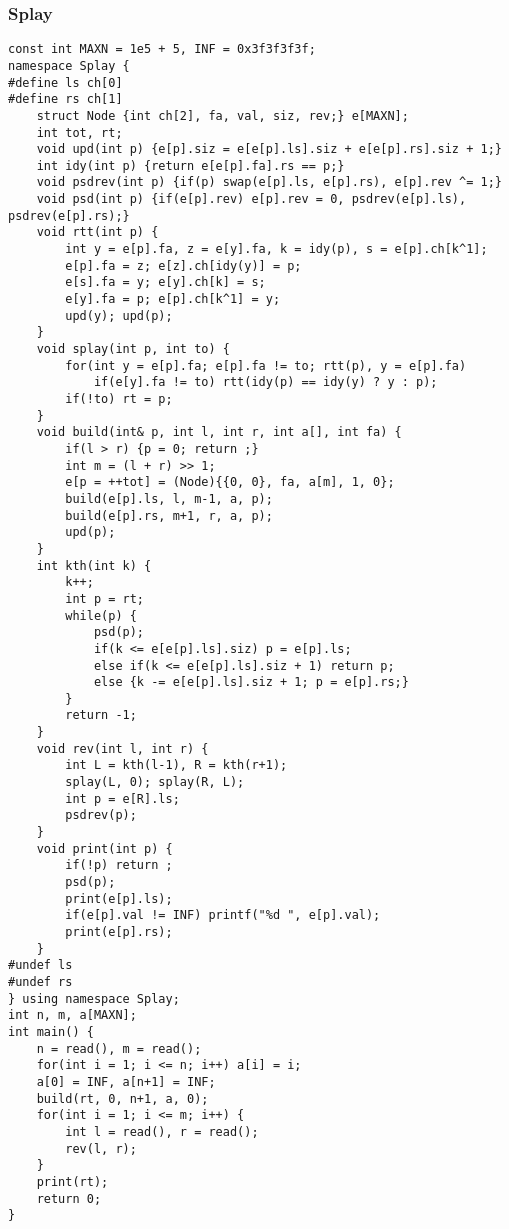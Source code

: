 \documentclass{article}
\begin{document}
   \subsubsection{Splay}
   \begin{lstlisting}
const int MAXN = 1e5 + 5, INF = 0x3f3f3f3f;
namespace Splay { 
#define ls ch[0]
#define rs ch[1]
	struct Node {int ch[2], fa, val, siz, rev;} e[MAXN];
	int tot, rt;
	void upd(int p) {e[p].siz = e[e[p].ls].siz + e[e[p].rs].siz + 1;}
	int idy(int p) {return e[e[p].fa].rs == p;}
	void psdrev(int p) {if(p) swap(e[p].ls, e[p].rs), e[p].rev ^= 1;}
	void psd(int p) {if(e[p].rev) e[p].rev = 0, psdrev(e[p].ls), psdrev(e[p].rs);}
	void rtt(int p) {
		int y = e[p].fa, z = e[y].fa, k = idy(p), s = e[p].ch[k^1];
		e[p].fa = z; e[z].ch[idy(y)] = p;
		e[s].fa = y; e[y].ch[k] = s;
		e[y].fa = p; e[p].ch[k^1] = y;
		upd(y); upd(p);
	}
	void splay(int p, int to) {
		for(int y = e[p].fa; e[p].fa != to; rtt(p), y = e[p].fa)
			if(e[y].fa != to) rtt(idy(p) == idy(y) ? y : p);
		if(!to) rt = p;
	}
	void build(int& p, int l, int r, int a[], int fa) {
		if(l > r) {p = 0; return ;}
		int m = (l + r) >> 1;
		e[p = ++tot] = (Node){{0, 0}, fa, a[m], 1, 0};
		build(e[p].ls, l, m-1, a, p);
		build(e[p].rs, m+1, r, a, p);
		upd(p);
	}
	int kth(int k) {
		k++;
		int p = rt;
		while(p) {
			psd(p);
			if(k <= e[e[p].ls].siz) p = e[p].ls;
			else if(k <= e[e[p].ls].siz + 1) return p;
			else {k -= e[e[p].ls].siz + 1; p = e[p].rs;}
		}
		return -1;
	}
	void rev(int l, int r) {
		int L = kth(l-1), R = kth(r+1);
		splay(L, 0); splay(R, L);
		int p = e[R].ls;
		psdrev(p);
	}
	void print(int p) {
		if(!p) return ;
		psd(p);
		print(e[p].ls);
		if(e[p].val != INF) printf("%d ", e[p].val);
		print(e[p].rs);
	}
#undef ls
#undef rs
} using namespace Splay;
int n, m, a[MAXN];
int main() {
	n = read(), m = read();
	for(int i = 1; i <= n; i++) a[i] = i;
	a[0] = INF, a[n+1] = INF;
	build(rt, 0, n+1, a, 0);
	for(int i = 1; i <= m; i++) {
		int l = read(), r = read();
		rev(l, r);
	}
	print(rt);
	return 0;
}
   \end{lstlisting}
\end{document}
